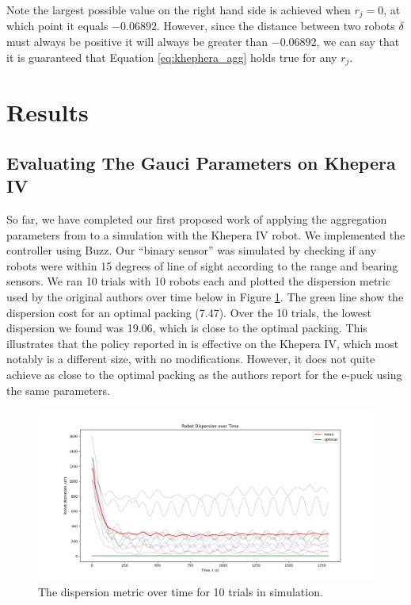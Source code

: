 \documentclass[conference]{IEEEtran}
\begin{document}
   Note the largest possible value on the right hand side is achieved when $r_j=0$, at which point it equals $-0.06892$. However, since the distance between two robots $\delta$ must always be positive it will always be greater than $-0.06892$, we can say that it is guaranteed that Equation \ref{eq:khephera_agg} holds true for any $r_j$.

\section{Results}

  \subsection{Evaluating The Gauci Parameters on Khepera IV}

  So far, we have completed our first proposed work of applying the aggregation parameters from \cite{gauci_self-organized_2014} to a simulation with the Khepera IV robot. We implemented the controller using Buzz. Our ``binary sensor'' was simulated by checking if any robots were within 15 degrees of line of sight according to the range and bearing sensors. We ran 10 trials with 10 robots each and plotted the dispersion metric used by the original authors over time below in Figure \ref{fig:dispersion_gauci}. The green line show the dispersion cost for an optimal packing (7.47). Over the 10 trials, the lowest dispersion we found was 19.06, which is close to the optimal packing. This illustrates that the policy reported in \cite{gauci_self-organized_2014} is effective on the Khepera IV, which most notably is a different size, with no modifications. However, it does not quite achieve as close to the optimal packing as the authors report for the e-puck using the same parameters.

  \begin{figure}
    \centering
    \includegraphics[width=1\linewidth]{./images/robot_dispersion_over_10_trials.png}
    \caption{The dispersion metric over time for 10 trials in simulation.}
    \label{fig:dispersion_gauci}
  \end{figure}
\end{document}
